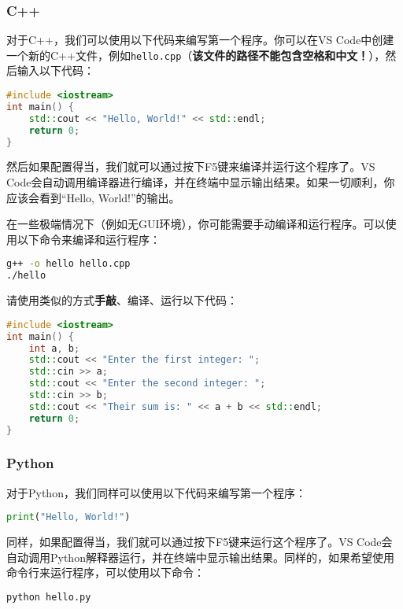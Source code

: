 \documentclass[../main.tex]{subfiles}
\begin{document}
\subsubsection{C++}



对于C++，我们可以使用以下代码来编写第一个程序。你可以在VS Code中创建一个新的C++文件，例如\texttt{hello.cpp}（\textbf{该文件的路径不能包含空格和中文！}），然后输入以下代码：

\begin{lstlisting}[language=C++]
#include <iostream>
int main() {
    std::cout << "Hello, World!" << std::endl;
    return 0;
}
\end{lstlisting}

然后如果配置得当，我们就可以通过按下F5键来编译并运行这个程序了。VS Code会自动调用编译器进行编译，并在终端中显示输出结果。如果一切顺利，你应该会看到“Hello, World!”的输出。

在一些极端情况下（例如无GUI环境），你可能需要手动编译和运行程序。可以使用以下命令来编译和运行程序：

\begin{lstlisting}[language=bash]
g++ -o hello hello.cpp
./hello
\end{lstlisting}

请使用类似的方式\textbf{手敲}、编译、运行以下代码：

\begin{lstlisting}[language=C++]
#include <iostream>
int main() {
    int a, b;
    std::cout << "Enter the first integer: ";
    std::cin >> a;
    std::cout << "Enter the second integer: ";
    std::cin >> b;
    std::cout << "Their sum is: " << a + b << std::endl;
    return 0;
}
\end{lstlisting}

\subsubsection{Python}

对于Python，我们同样可以使用以下代码来编写第一个程序：

\begin{lstlisting}[language=Python]
print("Hello, World!")
\end{lstlisting}

同样，如果配置得当，我们就可以通过按下F5键来运行这个程序了。VS Code会自动调用Python解释器运行，并在终端中显示输出结果。同样的，如果希望使用命令行来运行程序，可以使用以下命令：

\begin{lstlisting}[language=bash]
python hello.py
\end{lstlisting}
\end{document}
